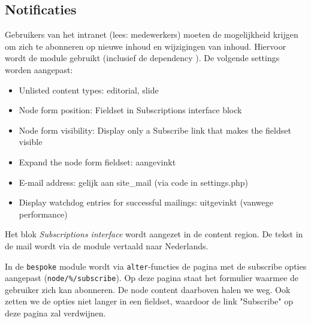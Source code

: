 \subsection{Notificaties}\label{notificaties}

Gebruikers van het intranet (lees: medewerkers) moeten de mogelijkheid krijgen om zich te abonneren op nieuwe inhoud en wijzigingen van inhoud. Hiervoor wordt de  module gebruikt (inclusief de dependency ). De volgende settings worden aangepast:
\begin{itemize}
\item Unlisted content types: editorial, slide
\item Node form position: Fieldset in Subscriptions interface block
\item Node form visibility: Display only a Subscribe link that makes the fieldset visible 
\item Expand the node form fieldset: aangevinkt
\item E-mail address: gelijk aan site\_mail (via code in settings.php)
\item Display watchdog entries for successful mailings: uitgevinkt (vanwege performance)
\end{itemize}
Het blok \emph{Subscriptions interface} wordt aangezet in de content region.
De tekst in de mail wordt via de  module vertaald naar Nederlands.

In de \texttt{bespoke} module wordt via \texttt{alter}-functies de pagina met de subscribe opties aangepast (\texttt{node/\%/subscribe}). Op deze pagina staat het formulier waarmee de gebruiker zich kan abonneren. De node content daarboven halen we weg. Ook zetten we de opties niet langer in een fieldset, waardoor de link "Subscribe" op deze pagina zal verdwijnen.

